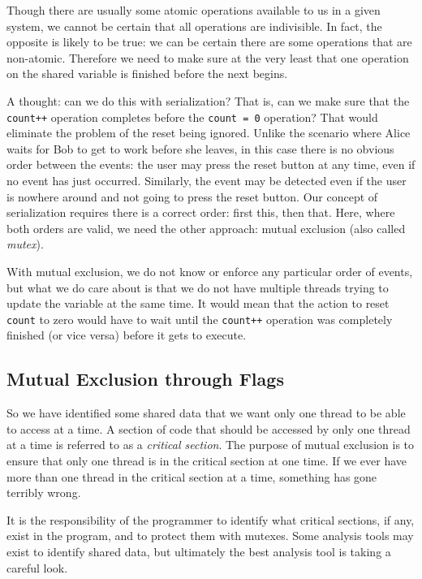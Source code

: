 Though there are usually some atomic operations available to us in a given system, we cannot be certain that all operations are indivisible. In fact, the opposite is likely to be true: we can be certain there are some operations that are non-atomic. Therefore we need to make sure at the very least that one operation on the shared variable is finished before the next begins.

A thought: can we do this with serialization? That is, can we make sure that the \texttt{count++} operation completes before the \texttt{count = 0} operation? That would eliminate the problem of the reset being ignored. Unlike the scenario where Alice waits for Bob to get to work before she leaves, in this case there is no obvious order between the events: the user may press the reset button at any time, even if no event has just occurred. Similarly, the event may be detected even if the user is nowhere around and not going to press the reset button. Our concept of serialization requires there is a correct order: first this, then that. Here, where both orders are valid, we need the other approach: mutual exclusion (also called \textit{mutex}).

With mutual exclusion, we do not know or enforce any particular order of events, but what we do care about is that we do not have multiple threads trying to update the variable at the same time. It would mean that the action to reset \texttt{count} to zero would have to wait until the \texttt{count++} operation was completely finished (or vice versa) before it gets to execute. 

\subsection*{Mutual Exclusion through Flags}
So we have identified some shared data that we want only one thread to be able to access at a time. A section of code that should be accessed by only one thread at a time is referred to as a \textit{critical section}. The purpose of mutual exclusion is to ensure that only one thread is in the critical section at one time. If we ever have more than one thread in the critical section at a time, something has gone terribly wrong.

It is the responsibility of the programmer to identify what critical sections, if any, exist in the program, and to protect them with mutexes. Some analysis tools may exist to identify shared data, but ultimately the best analysis tool is taking a careful look. 

